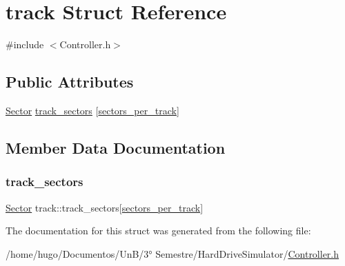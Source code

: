 \hypertarget{structtrack}{}\section{track Struct Reference}
\label{structtrack}


{\ttfamily \#include $<$Controller.\+h$>$}

\subsection*{Public Attributes}
\begin{DoxyCompactItemize}
\item 
\hyperlink{Controller_8h_a8cca6de5b7a5aa7542b645270752e38b}{Sector} \hyperlink{structtrack_a849c8deb5b0ebad6205f84f6486867d8}{track\+\_\+sectors} \mbox{[}\hyperlink{Controller_8h_ab4b038d52bc29ca8c6b9c7964caf53b8}{sectors\+\_\+per\+\_\+track}\mbox{]}
\end{DoxyCompactItemize}


\subsection{Member Data Documentation}
\mbox{\label{structtrack_a849c8deb5b0ebad6205f84f6486867d8}} 
\subsubsection{\texorpdfstring{track\+\_\+sectors}{track\_sectors}}
{\footnotesize\ttfamily \hyperlink{Controller_8h_a8cca6de5b7a5aa7542b645270752e38b}{Sector} track\+::track\+\_\+sectors\mbox{[}\hyperlink{Controller_8h_ab4b038d52bc29ca8c6b9c7964caf53b8}{sectors\+\_\+per\+\_\+track}\mbox{]}}



The documentation for this struct was generated from the following file\+:\begin{DoxyCompactItemize}
\item 
/home/hugo/\+Documentos/\+Un\+B/3° Semestre/\+Hard\+Drive\+Simulator/\hyperlink{Controller_8h}{Controller.\+h}\end{DoxyCompactItemize}
